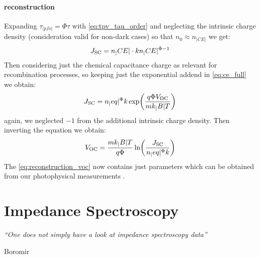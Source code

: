 	\paragraph{ reconstruction}
	Expanding $\tau_|pfo| = \Phi \tau$ with \cref{eq:tpv_tau_order} and neglecting the intrinsic charge density (consideration valid for non-dark cases) so that $n_0 \approx n_|CE|$ we get:
	\begin{equation}
		J_\mathrm{SC} = n_|CE| \cdot k n_|CE|^{\Phi-1}
	\end{equation}
	Then considering just the chemical capacitance charge as relevant for recombination processes, so keeping just the exponential addend in \cref{eq:ce_full} we obtain:
	\begin{equation}
		J_\mathrm{SC} = n_|eq|^\Phi k \exp(\frac{q \Phi V_\mathrm{OC}}{m k_|B| T})
	\end{equation}
	again, we neglected $-1$ from the additional intrinsic charge density. Then inverting the equation we obtain:
	\begin{equation}\label{eq:reconstruction_voc}
		V_\mathrm{OC} = \frac{m k_|B| T}{q \Phi} \ln( \frac{J_\mathrm{SC}}{n_|eq|^\Phi k} )
	\end{equation}
	The \cref{eq:reconstruction_voc} now contains just parameters which can be obtained from our photophysical measurements \cite{Wheeler2015,Wheeler2017,Du2018,Barnes2011a}.

\section{Impedance Spectroscopy}\label{characterization_impedance}
	\epigraph{\textit{\enquote{One does not simply have a look at impedance spectroscopy data}}}{Boromir}

